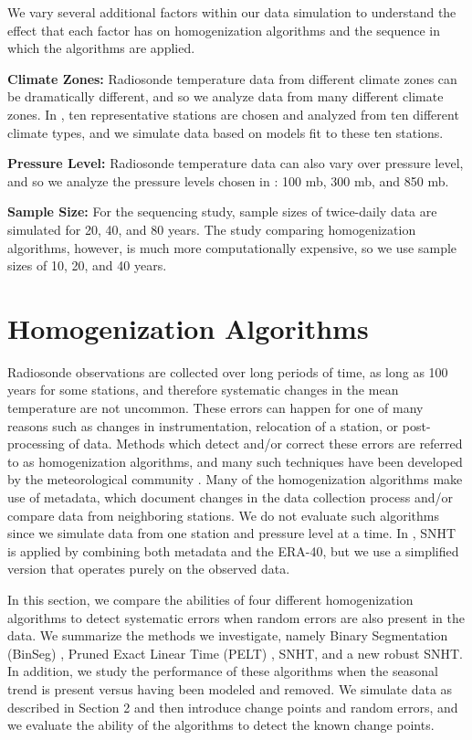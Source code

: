 \documentclass[12pt]{article}
\begin{document}
\begin{doublespacing}
We vary several additional factors within our data simulation to understand the effect that each factor has on homogenization algorithms and the sequence in which the algorithms are applied.

\textbf{Climate Zones:} Radiosonde temperature data from different climate zones can be dramatically different, and so we analyze data from many different climate zones.  In \cite{bell14}, ten representative stations are chosen and analyzed from ten different climate types, and we simulate data based on models fit to these ten stations.

\textbf{Pressure Level:} Radiosonde temperature data can also vary  over pressure level, and so we analyze the pressure levels chosen in \cite{bell14}: 100 mb, 300 mb, and 850 mb.

\textbf{Sample Size:}  For the sequencing study, sample sizes of twice-daily data are simulated for 20, 40, and 80 years.  The study comparing homogenization algorithms, however, is much more computationally expensive, so we use sample sizes of 10, 20, and 40 years.

\section{Homogenization Algorithms}

Radiosonde observations are collected over long periods of time, as long as 100 years for some stations, and therefore systematic changes in the mean temperature are not uncommon.  These errors can happen for one of many reasons such as changes in instrumentation, relocation of a station, or post-processing of data.  Methods which detect and/or correct these errors are referred to as homogenization algorithms, and many such techniques have been developed by the meteorological community \cite{alexandersson86, domonkos13, gruber08, haimberger07, lanzante03, li14, lu10, venema12}.  Many of the homogenization algorithms make use of metadata, which document changes in the data collection process and/or compare data from neighboring stations.  We do not evaluate such algorithms since we simulate data from one station and pressure level at a time.  In \cite{haimberger07}, SNHT is applied by combining both metadata and the ERA-40, but we use a simplified version that operates purely on the observed data.

In this section, we compare the abilities of four different homogenization algorithms to detect systematic errors when random errors are also present in the data.  We summarize the methods we investigate, namely Binary Segmentation (BinSeg) \cite{scott74}, Pruned Exact Linear Time (PELT) \cite{killick12}, SNHT, and a new robust SNHT.  In addition, we study the performance of these algorithms when the seasonal trend is present versus having been modeled and removed.  We simulate data as described in Section 2 and then introduce change points and random errors, and we evaluate the ability of the algorithms to detect the known change points. 


\end{doublespacing}
\end{document}
